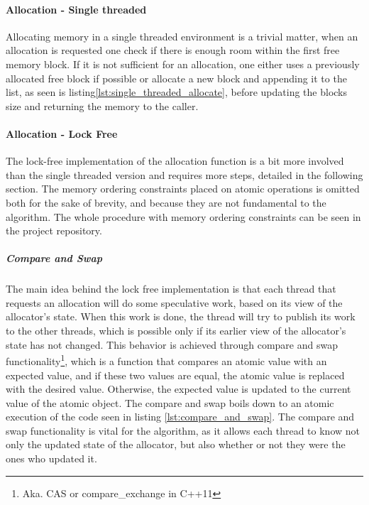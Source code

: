 \paragraph{Allocation - Single threaded}
Allocating memory in a single threaded environment is a trivial matter, when an allocation is requested one check if there is enough room within the first free memory block.
If it is not sufficient for an allocation, one either uses a previously allocated free block if possible or allocate a new block and appending it to the list, as seen is listing\ref{lst:single_threaded_allocate}, before updating the blocks size and returning the memory to the caller.


\paragraph{Allocation - Lock Free}
The lock-free implementation of the allocation function is a bit more involved than the single threaded version and requires more steps, detailed in the following section. 
The memory ordering constraints placed on atomic operations is omitted both for the sake of brevity, and because they are not fundamental to the algorithm.
The whole procedure with memory ordering constraints can be seen in the project repository.

\subparagraph{Compare and Swap}
The main idea behind the lock free implementation is that each thread that requests an allocation will do some speculative work, based on its view of the allocator's state. 
When this work is done, the thread will try to publish its work to the other threads, which is possible only if its earlier view of the allocator's state has not changed.
This behavior is achieved through compare and swap functionality\footnote{Aka. CAS or compare\_exchange in C++11}, which is a function that compares an atomic value with an expected value, and if these two values are equal, the atomic value is replaced with the desired value.
Otherwise, the expected value is updated to the current value of the atomic object. 
The compare and swap boils down to an atomic execution of the code seen in listing \ref{lst:compare_and_swap}.
The compare and swap functionality is vital for the algorithm, as it allows each thread to know not only the updated state of the allocator, but also whether or not they were the ones who updated it.


